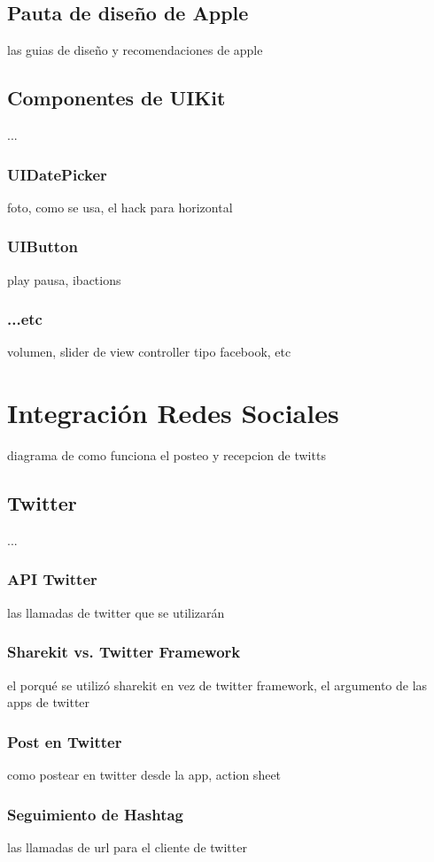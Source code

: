   \subsection{Pauta de diseño de Apple}
		las guias de diseño y recomendaciones de apple
	
	\subsection{Componentes de UIKit}
	...
		\subsubsection{UIDatePicker}
		foto, como se usa, el hack para horizontal
		\subsubsection{UIButton}
		play pausa, ibactions
		\subsubsection{...etc}
		volumen, slider de view controller tipo facebook, etc
\clearpage
\section{Integración Redes Sociales}
	diagrama de como funciona el posteo y recepcion de twitts
	\subsection{Twitter}
	...
		\subsubsection{API Twitter}
		las llamadas de twitter que se utilizarán
		\subsubsection{Sharekit vs. Twitter Framework}
		el porqué se utilizó sharekit en vez de twitter framework, el argumento de las apps de twitter
		\subsubsection{Post en Twitter}
		como postear en twitter desde la app, action sheet
		\subsubsection{Seguimiento de Hashtag}
		las llamadas de url para el cliente de twitter

